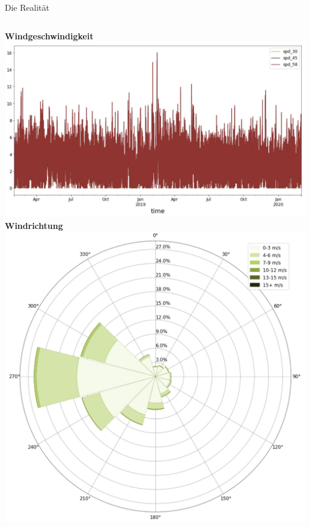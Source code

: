 \documentclass[aspectratio=169,11pt]{beamer}
\begin{document}
\begin{frame}{Die Realität}
\begin{columns}[T]
    	\begin{column}{0.33\textwidth}
    		\textbf{Windgeschwindigkeit} \\
    		\includegraphics[width=0.75\linewidth]{../img/speed}
  			\textbf{Windrichtung} \\
    		\includegraphics[height=0.3\textheight]{../img/direction}
		\end{column}
    \end{columns}
\end{frame}
\end{document}
